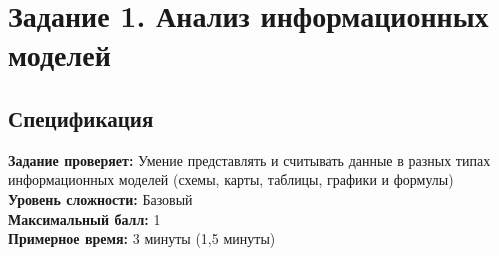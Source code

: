 \documentclass[12pt]{article}
\theoremstyle{problem_style}
\begin{document}
 
%

\tableofcontents
\newpage

\section{Задание 1. Анализ информационных моделей}
\subsection{Спецификация}
\textbf{Задание проверяет:}
Умение представлять и считывать данные в разных типах информационных моделей (схемы, карты, таблицы, графики и формулы)\\
\textbf{Уровень сложности:}
Базовый\\
\textbf{Максимальный балл:}
1\\
\textbf{Примерное время:}
3 минуты (1,5 минуты)
\end{document}
